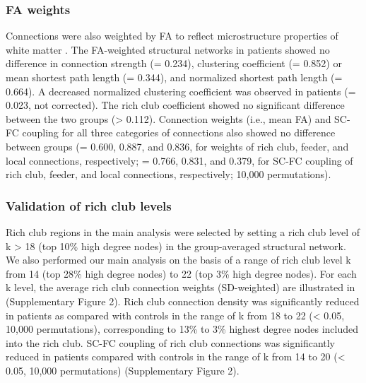 \begin{refsection}
\subsubsection*{FA weights}
Connections were also weighted by FA to reflect microstructure properties of white matter \citep{Beaulieu2002TheBO}. The FA-weighted structural networks in patients showed no difference in connection strength (\pval = 0.234), clustering coefficient (\pval = 0.852) or mean shortest path length (\pval = 0.344), and normalized shortest path length (\pval = 0.664). A decreased normalized clustering coefficient was observed in patients (\pval = 0.023, not corrected). The rich club coefficient showed no significant difference between the two groups (\pval > 0.112). Connection weights (i.e., mean FA) and SC-FC coupling for all three categories of connections also showed no difference between groups (\pval = 0.600, 0.887, and 0.836, for weights of rich club, feeder, and local connections, respectively; \pval = 0.766, 0.831, and 0.379, for SC-FC coupling of rich club, feeder, and local connections, respectively; 10,000 permutations).

\subsubsection*{Validation of rich club levels}
Rich club regions in the main analysis were selected by setting a rich club level of k > 18 (top 10\% high degree nodes) in the group-averaged structural network. We also performed our main analysis on the basis of a range of rich club level k from 14 (top 28\% high degree nodes) to 22 (top 3\% high degree nodes). For each k level, the average rich club connection weights (SD-weighted) are illustrated in (Supplementary Figure 2). Rich club connection density was significantly reduced in patients as compared with controls in the range of k from 18 to 22 (\pval  < 0.05, 10,000 permutations), corresponding to 13\% to 3\% highest degree nodes included into the rich club. SC-FC coupling of rich club connections was significantly reduced in patients compared with controls in the range of k from 14 to 20 (\pval < 0.05, 10,000 permutations) (Supplementary Figure 2).


\end{refsection}
